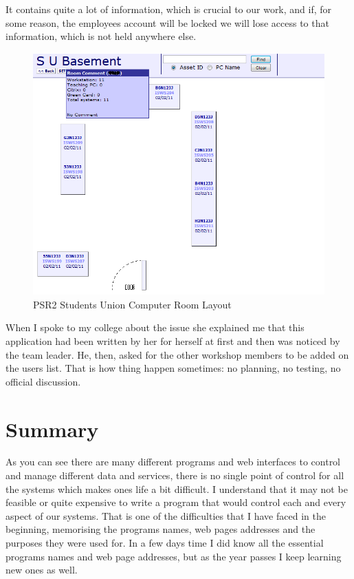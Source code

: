\documentclass[10pt,a4paper,headinclude=true,twoside]{report}
\begin{document}
It contains quite a lot of information, which is crucial to our work, and if, for some reason, the employees account will be locked we will lose access to that information, which is not held anywhere else.

\begin{figure}[H]
\includegraphics[scale=0.5]{./PSR2_SU_Room_layout}
\caption{PSR2 Students Union Computer Room Layout}
\label{fig:PSR2_SU_Room_layout}
\end{figure}

When I spoke to my college about the issue she explained me that this application had been written by her for herself at first and then was noticed by the team leader. He, then, asked for the other workshop members to be added on the users list. That is how thing happen sometimes: no planning, no testing, no official discussion.

\section{Summary}
As you can see there are many different programs and web interfaces to control and manage different data and services, there is no single point of control for all the systems which makes ones life a bit difficult. I understand that it may not be feasible or quite expensive to write a program that would control each and every aspect of our systems. That is one of the difficulties that I have faced in the beginning, memorising the programs names, web pages addresses and the purposes they were used for. In a few days time I did know all the essential programs names and web page addresses, but as the year passes I keep learning new ones as well.   
\end{document}
